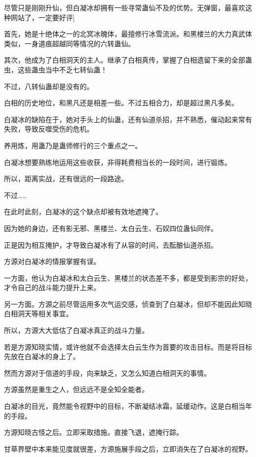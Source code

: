 
\begin{this_body}

尽管只是刚刚升仙，但白凝冰却拥有一些寻常蛊仙不及的优势。无弹窗，最喜欢这种网站了，一定要好评]

首先，她是十绝体之一的北冥冰魄体，最擅修行冰雪流派。和黑楼兰的大力真武体类似，一身道痕超越同等情况的六转蛊仙。

其次，他成为了白相洞天的主人。继承了白相真传，掌握了白相遗留下来的全部蛊虫，这些蛊虫当中不乏七转仙蛊！

不过，八转仙蛊却是没有的。

白相的历史地位，和黑凡还是相差一些。不过五相合力，却是超过黑凡多矣。

白凝冰的缺陷在于，她对手头上的仙蛊，还有仙道杀招，并不熟悉，催动起来常有失败，导致反噬受伤的危机。

养用炼，用蛊乃是蛊师修行的三个重点之一。

白凝冰想要熟练地运用这些收获，非得耗费相当长的一段时间，进行锻炼。

所以，距离实战，还有很远的一段路途。

不过……

在此时此刻，白凝冰的这个缺点却被有效地遮掩了。

因为她的身边，还有影无邪、黑楼兰、太白云生、石奴四位蛊仙同伴。

正是因为相互掩护，才导致白凝冰有了从容的时间，去酝酿仙道杀招。

方源对白凝冰的情报掌握有误。

一方面，他认为白凝冰和太白云生、黑楼兰的状态差不多，都是受到影宗的好处，才令自己的战斗能力提升上来。

另一方面。方源之前尽管运用多次气运交感，侦查到了白凝冰，但却不能因此知晓白相洞天等相关事宜。

所以，方源大大低估了白凝冰真正的战斗力量。

若是方源知晓实情，或许他就不会选择太白云生作为首要的攻击目标。而是将目标先放在白凝冰的身上了。

然而方源对于信道的手段，向来缺乏，又怎么知道白相洞天的事情。

方源虽然是重生之人，但远远不是全知全能者。

白凝冰的目光，竟然能令视野中的目标，不断凝结冰霜，延缓动作。这是白相当年的手段。

方源知晓古怪之后。立即采取措施。直接飞退，遮掩行踪。

甘草界壁中本来能见度就很差，方源施展手段之后，立即消失在了白凝冰的视野。


\end{this_body}
